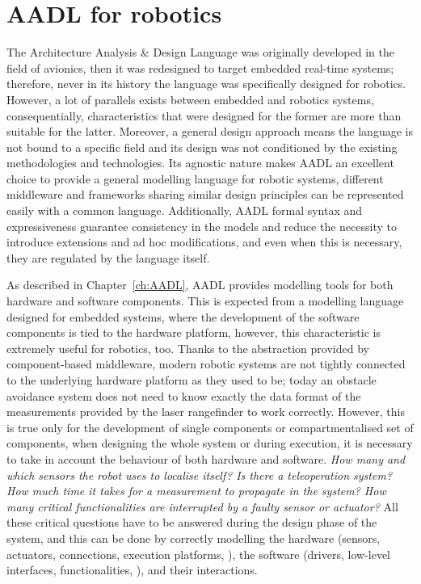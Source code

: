 \section{AADL for robotics}
\label{sec:aadl-robot}
The Architecture Analysis \& Design Language was originally developed in the field of avionics, then it was redesigned to target embedded real-time systems; therefore, never in its history the language was specifically designed for robotics. However, a lot of parallels exists between embedded and robotics systems, consequentially, characteristics that were designed for the former are more than suitable for the latter. Moreover, a general design approach means the language is not bound to a specific field and its design was not conditioned by the existing methodologies and technologies. Its agnostic nature makes AADL an excellent choice to provide a general modelling language for robotic systems, different middleware and frameworks sharing similar design principles can be represented easily with a common language. Additionally, AADL formal syntax and expressiveness guarantee consistency in the models and reduce the necessity to introduce extensions and ad hoc modifications, and even when this is necessary, they are regulated by the language itself.

As described in Chapter~\ref{ch:AADL}, AADL provides modelling tools for both hardware and software components. This is expected from a modelling language designed for embedded systems, where the development of the software components is tied to the hardware platform, however, this characteristic is extremely useful for robotics, too. Thanks to the abstraction provided by component-based middleware, modern robotic systems are not tightly connected to the underlying hardware platform as they used to be; today an obstacle avoidance system does not need to know exactly the data format of the measurements provided by the laser rangefinder to work correctly. However, this is true only for the development of single components or compartmentalised set of components, when designing the whole system or during execution, it is necessary to take in account the behaviour of both hardware and software. \textit{How many and which sensors the robot uses to localise itself? Is there a teleoperation system? How much time it takes for a measurement to propagate in the system? How many critical functionalities are interrupted by a faulty sensor or actuator?} All these critical questions have to be answered during the design phase of the system, and this can be done by correctly modelling the hardware (sensors, actuators, connections, execution platforms, \etc), the software (drivers, low-level interfaces, functionalities, \etc), and their interactions.

